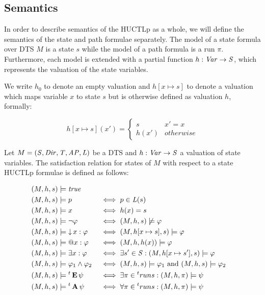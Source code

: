 \subsection{Semantics}

In order to describe semantics of the \ac{HUCTLp} as a whole, we will define the semantics of the state and path formulae separately. The model of a state formula over \ac{DTS} $M$ is a state $s$ while the model of a path formula is a run $\pi$. Furthermore, each model is extended with a partial function $h : \mathit{Var} \to \mathit{S}$, which represents the valuation of the state variables.

We write $h_0$ to denote an empty valuation and $h[x \mapsto s]$ to denote a valuation which maps variable $x$ to state $s$ but is otherwise defined as valuation $h$, formally:

\[
	h[x \mapsto s](x') = \begin{cases}
		s & x' = x \\
		h(x') & otherwise
	\end{cases}
\]

Let $M = (\mathit{S}, \mathit{Dir}, \mathit{T}, \mathit{AP}, \mathit{L})$ be a \ac{DTS} and $h : \mathit{Var} \to \mathit{S}$ a valuation of state variables. The satisfaction relation for states of $M$ with respect to a state \ac{HUCTLp} formulae is defined as follows:

\begin{alignat*}{2}
	(M,h,s) &\models \mathit{true}	\\
	(M,h,s) &\models p										   && \iff p \in \mathit{L}(s) \\
	(M,h,s) &\models x										   && \iff h(x) = s \\
	(M,h,s) &\models \neg \varphi  						  && \iff (M, h,s) \not\models \varphi \\
	(M,h,s) &\models \operatorname{\downarrow} x : \varphi 			   && \iff (M,h[x \mapsto s], s) \models \varphi \\
	(M,h,s) &\models \operatorname{@\!} x : \varphi 				&& \iff (M,h,h(x)) \models \varphi \\
	(M,h,s) &\models \exists x : \varphi 		  && \iff \exists s' \in \mathit{S} :  (M,h[x \mapsto s'], s) \models \varphi \\	
	(M,h,s) &\models \varphi_1 \land \varphi_2 	   && \iff (M,h,s) \models \varphi_1 \text{ and } (M,h,s) \models \varphi_2  \\
	(M,h,s) &\models {}^{t}\operatorname{\mathbf{E}} \psi 			 && \iff \exists \pi \in {}^{t}runs : (M,h,\pi) \models \psi \\
	(M,h,s) &\models {}^{t}\operatorname{\mathbf{A}} \psi 			 && \iff \forall \pi \in {}^{t}runs : (M,h,\pi) \models \psi \\	
\end{alignat*}

